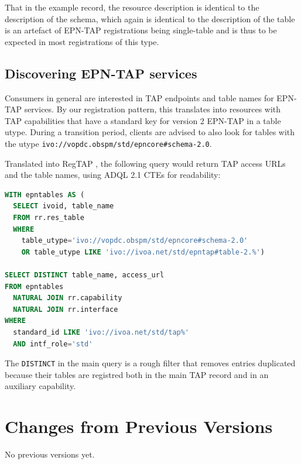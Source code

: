 \documentclass[11pt,a4paper]{ivoa}
\begin{document}
That in the example record, the resource description is identical to the
description of the schema, which again is identical to the description
of the table is an artefact of EPN-TAP registrations being single-table
and is thus to be expected in most registrations of this type.

\subsection{Discovering EPN-TAP services}

Consumers in general are interested in TAP endpoints and table names for
EPN-TAP services.  By our registration pattern, this translates into
resources with TAP capabilities that have a standard key for version 2
EPN-TAP in a table utype.  During a transition period, clients are
advised to also look for tables with the utype
\verb|ivo://vopdc.obspm/std/epncore#schema-2.0|.

Translated into RegTAP \citep{2019ivoa.spec.1011D}, the following query
would return TAP access URLs and the table names, using ADQL 2.1 CTEs
for readability:

\begin{lstlisting}[language=SQL]
WITH epntables AS (
  SELECT ivoid, table_name
  FROM rr.res_table
  WHERE
    table_utype='ivo://vopdc.obspm/std/epncore#schema-2.0'
    OR table_utype LIKE 'ivo://ivoa.net/std/epntap#table-2.%')

SELECT DISTINCT table_name, access_url
FROM epntables
  NATURAL JOIN rr.capability
  NATURAL JOIN rr.interface
WHERE
  standard_id LIKE 'ivo://ivoa.net/std/tap%'
  AND intf_role='std'
\end{lstlisting}

The \texttt{DISTINCT} in the main query is a rough filter that removes
entries duplicated because their tables are registred both in the main
TAP record and in an auxiliary capability.

\appendix
\section{Changes from Previous Versions}

No previous versions yet.



\end{document}
